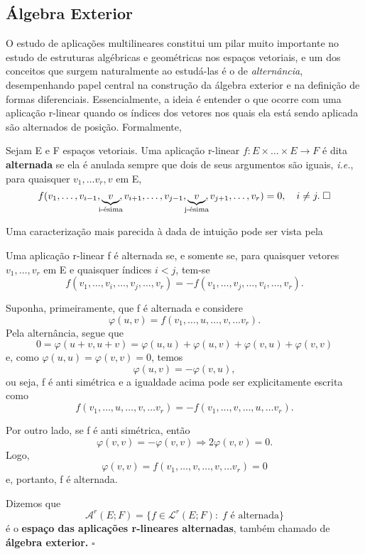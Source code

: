 \documentclass[../differential_forms.tex]{subfiles}
\begin{document}
\subsection{Álgebra Exterior}
O estudo de aplicações multilineares constitui um pilar muito importante no estudo de estruturas algébricas e geométricas nos espaços vetoriais, e um dos conceitos que surgem naturalmente ao estudá-las é o de \textit{alternância}, desempenhando papel central na construção da álgebra exterior e na definição de formas diferenciais. Essencialmente, a ideia é entender o que ocorre com uma aplicação r-linear quando os índices dos vetores nos quais ela está sendo aplicada são alternados de posição. Formalmente,
\begin{def*}
	Sejam E e F espaços vetoriais. Uma aplicação r-linear \(f:E\times \dotsc \times E\rightarrow F\) é dita \textbf{alternada} se ela é anulada sempre que dois de seus argumentos são iguais, \textit{i.e.}, para quaisquer \(v_1,\dotsc v_r, v\) em E,
	\[
		f(v_1,\dotsc , v_{i-1}, \underbrace{v}_{\mathclap{\text{i-ésima}}}, v_{i+1},\dotsc , v_{j-1}, \underbrace{v}_{\mathclap{\text{j-ésima}}}, v_{j+1},\dotsc , v_{r})=0, \quad i\neq j. \; \square
	\]
\end{def*}
Uma caracterização mais parecida à dada de intuição pode ser vista pela
\begin{prop*}
	Uma aplicação r-linear f é alternada se, e somente se, para quaisquer vetores \(v_1,\dotsc , v_{r}\) em E e quaisquer índices \(i<j\), tem-se
	\[
		f(v_1,\dotsc ,v_{i},\dotsc ,v_{j},\dotsc ,v_r)=-f(v_1,\dotsc ,v_{j},\dotsc ,v_{i},\dotsc ,v_r).
	\]
\end{prop*}
\begin{proof*}
	Suponha, primeiramente, que f é alternada e considere
	\[
		\varphi (u, v)=f(v_1,\dotsc , u,\dotsc ,v,\dotsc v_r).
	\]
	Pela alternância, segue que
	\[
		0=\varphi (u+v, u+v) = \varphi(u, u)+\varphi (u, v)+\varphi (v, u)+\varphi (v, v)
	\]
	e, como \(\varphi (u, u)=\varphi (v, v)=0\), temos
	\[
		\varphi (u,v) = -\varphi (v, u),
	\]
	ou seja, f é anti simétrica e a igualdade acima pode ser explicitamente escrita como
	\[
		f(v_1,\dotsc , u,\dotsc ,v,\dotsc v_r) = -f(v_1,\dotsc , v,\dotsc ,u,\dotsc v_r).
	\]

	Por outro lado, se f é anti simétrica, então
	\[
		\varphi (v, v)=-\varphi (v, v) \Rightarrow 2\varphi (v, v)=0.
	\]
	Logo,
	\[
		\varphi (v, v)=f(v_1,\dotsc , v,\dotsc ,v,\dotsc v_r) = 0
	\]
	e, portanto, f é alternada. \qedsymbol
\end{proof*}
\begin{def*}
	Dizemos que
	\[
		\mathcal{A}^{r}(E; F)=\{f\in \mathcal{L}^{r}(E; F):\; f \text{ é alternada}\}
	\]
	é o \textbf{espaço das aplicações r-lineares alternadas}, também chamado de \textbf{álgebra exterior.} \(\square\)
\end{def*}
\end{document}
